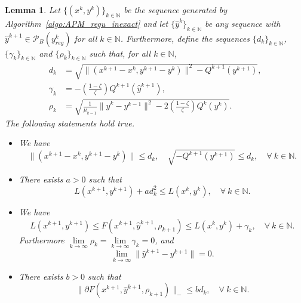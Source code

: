 \documentclass[pdflatex,sn-mathphys-num]{sn-jnl}
\numberwithin{equation}{section}%
\def\N{\mathbb{N}}
\newcommand{\yck}{{y_{reg}^k}}
\theoremstyle{thmstyleone}%
\newtheorem{lemma}[theorem]{Lemma}%
\theoremstyle{thmstyletwo}%
\theoremstyle{thmstylethree}%
\begin{document}
\begin{lemma}\label{lem:properties}
    Let $\{(x^k,y^k)\}_{k\in\N}$ be the sequence generated by Algorithm~\ref{algo:APM_regu_inexact} and let $\{\hat{y}^{k}\}_{k\in\N}$ be any sequence with $\hat{y}^{k+1}\in\mathcal{P}_B(\yck)$ for all $k\in\N$. Furthermore, define the sequences $\{d_k\}_{k\in\N}$, $\{\gamma_k\}_{k\in\N}$ and $\{\rho_k\}_{k\in\N}$ such that, for all $k\in\N$,
    \begin{align}
        d_k &= \sqrt{\|(x^{k+1}-x^k,y^{k+1}-y^k)\|^2-Q^{k+1}(y^{k+1})}, \label{eq:dk}\\
        \gamma_k&=-\left(\frac{1-\zeta}{\zeta}\right)Q^{k+1}(\hat{y}^{k+1}),\label{eq:rk}\\
        \rho_{k} &= \sqrt{\frac{1}{\mu_{k-1}}\|\hat{y}^{k}-y^{k-1}\|^2-2\left(\frac{1-\zeta}{\zeta}\right)Q^{k}(y^{k})}.\label{eq:rhok}
    \end{align}
    The following statements hold true.
    \begin{itemize}
        \item[(i)] We have
        \begin{equation}\label{eq:ineq_dk}
        \|(x^{k+1}-x^k,y^{k+1}-y^k)\| \leq d_k, \quad \sqrt{-Q^{k+1}(y^{k+1})} \leq d_k, \quad \forall \ k\in\N.
        \end{equation}
        \item[(ii)] There exists $a>0$ such that
        \begin{equation*}
            L(x^{k+1},y^{k+1})+ad_k^2\leq L(x^k,y^k), \quad \forall \ k\in \N.
            \end{equation*}    
            \item[(iii)] We have 
            \begin{equation}\label{eq:limit3}
                L(x^{k+1},y^{k+1})\leq F(x^{k+1},\hat{y}^{k+1},{\rho_{k+1}})\leq L(x^k,y^k)+\gamma_k, \quad \forall \ k\in \N. 
            \end{equation}
            Furthermore $\lim\limits_{k\rightarrow \infty} {\rho_k}=\lim\limits_{k\rightarrow \infty}\gamma_k=0$, and
            \begin{equation}\label{eq:limit2}
            \lim_{k\rightarrow \infty}\|\hat{y}^{k+1}-y^{k+1}\|=0.
            \end{equation}
            \item[(iv)] There exists $b>0$ such that 
            \begin{equation}\label{bound_sub}
                \|\partial F(x^{k+1},\hat{y}^{k+1},{\rho_{k+1}})\|_{-}\leq b d_k, \quad \forall \ k\in \N.
            \end{equation}
    \end{itemize} 
\end{lemma}
\end{document}

